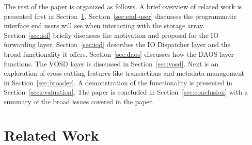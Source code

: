 \documentclass{sig-alt-gov2}
\begin{document}
The rest of the paper is organized as follows. A brief overview of related work
is presented first in Section~\ref{sec:related}. Section~\ref{sec:end-user}
discusses the programmatic interface end users will see when interacting with
the storage array.
Section~\ref{sec:iof}
briefly discusses the motivation and proposal for the IO forwarding layer.
Section~\ref{sec:iod} describes the IO Dispatcher layer and the broad
functionality it offers.
Section~\ref{sec:daos} discusses how the DAOS
layer functions.
The VOSD layer is discussed in Section~\ref{sec:vosd}.
Next is an exploration of cross-cutting features like transactions and
metadata management in Section~\ref{sec:broader}.
A demonstration of the functionality is presented in
Section~\ref{sec:evaluation}.
The paper is concluded in
Section~\ref{sec:conclusion} with a summary of the broad issues covered in the
paper.

\section{Related Work}
\label{sec:related}

%
\end{document}
